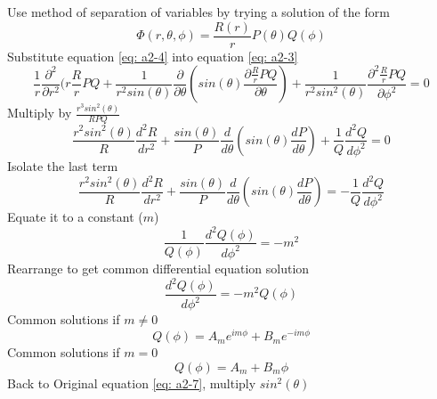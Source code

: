 \documentclass[12pt]{article}
\begin{document}
        Use method of separation of variables by trying a solution of the form
        \begin{equation} \label{eq: a2-4}
            \Phi(r,\theta,\phi) = \frac{R(r)}{r} P(\theta) Q(\phi)
        \end{equation}
        Substitute equation \ref{eq: a2-4} into equation \ref{eq: a2-3}
        \begin{equation} \label{eq: a2-5}
            \frac{1}{r} \frac{\partial^2}{\partial r^2} (r \frac{R}{r} PQ + \frac{1}{r^2 sin(\theta)} \frac{\partial}{\partial \theta} (sin(\theta) \frac{\partial \frac{R}{r} PQ}{\partial \theta}) + \frac{1}{r^2 sin^2(\theta)} \frac{\partial^2 \frac{R}{r} PQ}{\partial \phi^2} = 0
        \end{equation}
        Multiply by $\frac{r^3 sin^2(\theta)}{RPQ}$
        \begin{equation} \label{eq: a2-6}
            \frac{r^2 sin^2(\theta)}{R} \frac{d^2 R}{dr^2} + \frac{sin(\theta)}{P} \frac{d}{d\theta}(sin(\theta) \frac{dP}{d\theta}) + \frac{1}{Q} \frac{d^2Q}{d\phi^2} = 0
        \end{equation}
        Isolate the last term
        \begin{equation} \label{eq: a2-7}
            \frac{r^2 sin^2(\theta)}{R} \frac{d^2 R}{dr^2} + \frac{sin(\theta)}{P} \frac{d}{d\theta}(sin(\theta) \frac{dP}{d\theta}) = - \frac{1}{Q} \frac{d^2Q}{d\phi^2}
        \end{equation}
        Equate it to a constant ($m$)
        \begin{equation} \label{eq: a2-7}
            \frac{1}{Q(\phi)} \frac{d^2Q(\phi)}{d\phi^2} = -m^2
        \end{equation}
        Rearrange to get common differential equation solution
        \begin{equation} \label{eq: a2-8}
            \frac{d^2Q(\phi)}{d\phi^2} = -m^2 Q(\phi)
        \end{equation}
        Common solutions if $m\neq0$
        \begin{equation} \label{eq: a2-9}
            Q(\phi) = A_m e^{im\phi} + B_m e^{-im\phi}
        \end{equation}
        Common solutions if $m=0$
        \begin{equation} \label{eq: a2-10}
            Q(\phi) = A_m + B_m \phi
        \end{equation}
        Back to Original equation \ref{eq: a2-7}, multiply $sin^2(\theta)$ 
\end{document}
